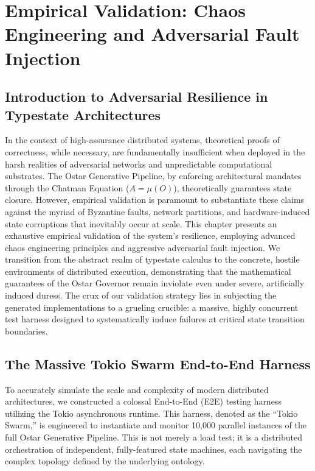 \chapter{Empirical Validation: Chaos Engineering and Adversarial Fault Injection}
\label{ch:eval_chaos}

\section{Introduction to Adversarial Resilience in Typestate Architectures}

In the context of high-assurance distributed systems, theoretical proofs of correctness, while necessary, are fundamentally insufficient when deployed in the harsh realities of adversarial networks and unpredictable computational substrates. The Ostar Generative Pipeline, by enforcing architectural mandates through the Chatman Equation ($A = \mu(O)$), theoretically guarantees state closure. However, empirical validation is paramount to substantiate these claims against the myriad of Byzantine faults, network partitions, and hardware-induced state corruptions that inevitably occur at scale. This chapter presents an exhaustive empirical validation of the system's resilience, employing advanced chaos engineering principles and aggressive adversarial fault injection. We transition from the abstract realm of typestate calculus to the concrete, hostile environments of distributed execution, demonstrating that the mathematical guarantees of the Ostar Governor remain inviolate even under severe, artificially induced duress. The crux of our validation strategy lies in subjecting the generated implementations to a grueling crucible: a massive, highly concurrent test harness designed to systematically induce failures at critical state transition boundaries.

\section{The Massive Tokio Swarm End-to-End Harness}

To accurately simulate the scale and complexity of modern distributed architectures, we constructed a colossal End-to-End (E2E) testing harness utilizing the Tokio asynchronous runtime. This harness, denoted as the ``Tokio Swarm,'' is engineered to instantiate and monitor 10,000 parallel instances of the full Ostar Generative Pipeline. This is not merely a load test; it is a distributed orchestration of independent, fully-featured state machines, each navigating the complex topology defined by the underlying ontology.

